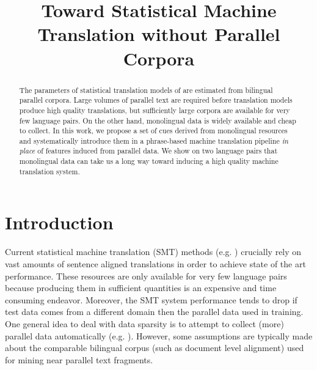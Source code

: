 \documentclass[11pt]{article}
\title{Toward Statistical Machine Translation without Parallel Corpora}
\author{}
\date{}
\newcommand{\mnote}[1]{\marginpar{%
  \vskip-\baselineskip
  \raggedright\footnotesize
  \itshape\hrule\smallskip\tiny{#1}\par\smallskip\hrule}}
\newcommand{\mtodo}[1]{\mnote{\textcolor{red}{#1}}}
\begin{document}
\maketitle
\begin{abstract}
The parameters of statistical translation models of are estimated from bilingual parallel corpora.    Large volumes of parallel text are required before translation models produce high quality translations, but sufficiently large corpora are available for  very few language pairs.  On the other hand, monolingual data is widely available and cheap to collect.  In this work, we propose a set of cues derived from monolingual resources and systematically introduce them in a phrase-based machine translation pipeline \emph{in place} of features induced from parallel data.  We show on two language pairs that monolingual data can take us a long way toward  inducing a high quality machine translation system.

\end{abstract}


\section{Introduction} \label{sect:intro}
Current statistical machine translation (SMT) methods (e.g. \cite{Koehn:2003,Chiang:2005}) crucially rely on vast amounts of sentence aligned translations in order to achieve state of the art performance.  These resources are only available for very few language pairs because producing them in sufficient quantities is an expensive and time consuming endeavor.  Moreover, the SMT system performance tends to drop if test data comes from a different domain then the parallel data used in training\mtodo{Need a good MT adaptation reference}.  One general idea to deal with data sparsity is to attempt to collect (more) parallel data automatically (e.g. \cite{Munteanu:2006,Smith:2010,Uszkoreit:2010}).\mtodo{Need a better "however" sentence.}  However, some assumptions are typically made about the comparable bilingual corpus (such as document level alignment) used for mining near parallel text fragments.
\end{document}
